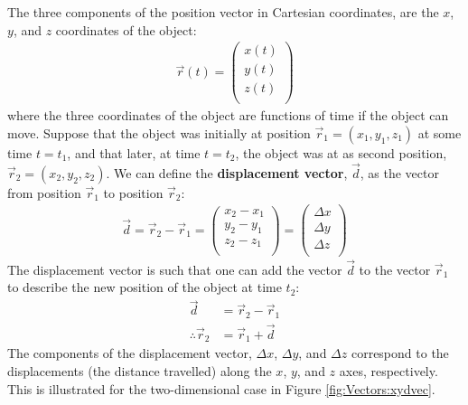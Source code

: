 The three components of the position vector in Cartesian coordinates, are the $x$, $y$, and $z$ coordinates of the object:
\begin{align*}
\vec r(t) = \begin{pmatrix}
           x(t) \\
           y(t) \\
           z(t) \\
         \end{pmatrix}
\end{align*}  
where the three coordinates of the object are functions of time if the object can move. Suppose that the object was initially at position $\vec r_1=(x_1, y_1, z_1)$ at some time $t=t_1$, and that later, at time $t=t_2$, the object was at as second position, $\vec r_2=(x_2, y_2, z_2)$. We can define the \textbf{displacement vector}, $\vec  d$, as the vector from position $\vec r_1$ to position $\vec r_2$:
\begin{align*}
 \vec d = \vec r_2 - \vec r_1 =\begin{pmatrix}
           x_2-x_1 \\
           y_2-y_1 \\
           z_2-z_1 \\
         \end{pmatrix} = \begin{pmatrix}
           \Delta x \\
           \Delta y \\
           \Delta z \\
         \end{pmatrix}
\end{align*}
The displacement vector is such that one can add the vector $\vec d$ to the vector $\vec r_1$ to describe the new position of the object at time $t_2$:
\begin{align*}
\vec d &= \vec r_2 - \vec r_1\\
\therefore \vec r_2 &= \vec r_1 + \vec d
\end{align*}
The components of the displacement vector, $\Delta x$, $\Delta y$, and $\Delta z$ correspond to the displacements (the distance travelled) along the $x$, $y$, and $z$ axes, respectively. This is illustrated for the two-dimensional case in Figure \ref{fig:Vectors:xydvec}.


